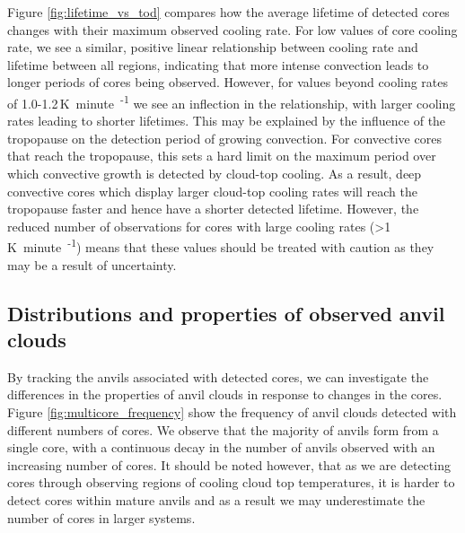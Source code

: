 Figure \ref{fig:lifetime_vs_tod} compares how the average lifetime of detected cores changes with their maximum observed cooling rate.
For low values of core cooling rate, we see a similar, positive linear relationship between cooling rate and lifetime between all regions, indicating that more intense convection leads to longer periods of cores being observed.
However, for values beyond cooling rates of 1.0-1.2\,\unit{K minute\textsuperscript{-1}} we see an inflection in the relationship, with larger cooling rates leading to shorter lifetimes.
This may be explained by the influence of the tropopause on the detection period of growing convection.
For convective cores that reach the tropopause, this sets a hard limit on the maximum period over which convective growth is detected by cloud-top cooling.
As a result, deep convective cores which display larger cloud-top cooling rates will reach the tropopause faster and hence have a shorter detected lifetime.
However, the reduced number of observations for cores with large cooling rates (>1\,\unit{K minute\textsuperscript{-1}}) means that these values should be treated with caution as they may be a result of uncertainty.



\subsection{Distributions and properties of observed anvil clouds}

By tracking the anvils associated with detected cores, we can investigate the differences in the properties of anvil clouds in response to changes in the cores.
Figure \ref{fig:multicore_frequency} show the frequency of anvil clouds detected with different numbers of cores.
We observe that the majority of anvils form from a single core, with a continuous decay in the number of anvils observed with an increasing number of cores.
It should be noted however, that as we are detecting cores through observing regions of cooling cloud top temperatures, it is harder to detect cores within mature anvils and as a result we may underestimate the number of cores in larger systems.


